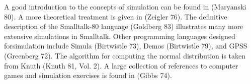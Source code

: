 
A good introduction to the concepts of simulation can be found in (Maryanski
80). A more theoretical treatment is given in (Zeigler 76). The definitive
description of the Smalltalk-80 language (Goldberg 83) illustrates many more
extensive simulations in Smalltalk. Other programming languages designed
forsimulation include Simula (Birtwistle 73), Demos (Birtwistle 79), and GPSS
(Greenberg 72). The algorithm for computing the normal distribution is taken
from Knuth (Knuth 81, Vol. 2). A large collection of references to computer
games and simulation exercises is found in (Gibbs 74).
